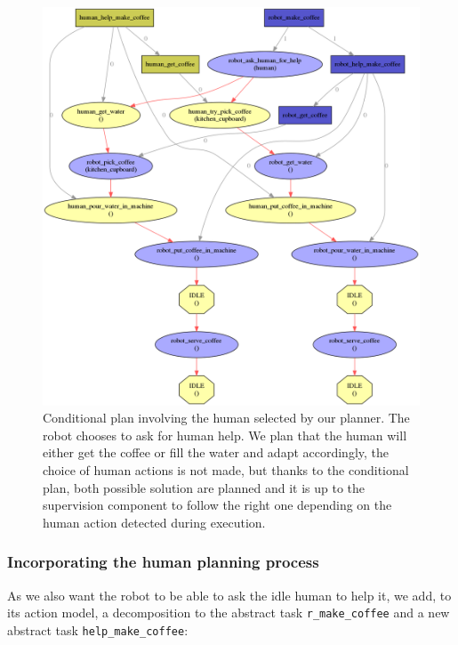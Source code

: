 \documentclass[a4paper,11pt,twoside]{StyleThese}
\begin{document}
\begin{figure}[hbtp]
\centering
\includegraphics[width=\textwidth]{figures/chapter4/Chap4CoopNoDivergence.png}
\caption{Conditional plan involving the human selected by our planner. The robot chooses to ask for human help. We plan that the human will either get the coffee or fill the water and adapt accordingly, the choice of human actions is not made, but thanks to the conditional plan, both possible solution are planned and it is up to the supervision component to follow the right one depending on the human action detected during execution.}
\label{fig:chap4coffeecoopnodivergence}
\end{figure}


\subsubsection{Incorporating the human planning process}
As we also want the robot to be able to ask the idle human to help it, we add, to its action model, a decomposition to the abstract task \verb'r_make_coffee' and a new abstract task \verb'help_make_coffee':
\end{document}

